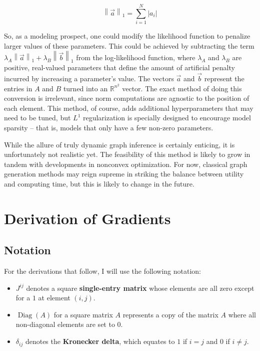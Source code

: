 \documentclass[12pt]{article}
\theoremstyle{definition}
\DeclareMathOperator{\Diag}{Diag}
\newcommand{\norm}[1]{\left\lVert#1\right\rVert}
\begin{document}
\begin{equation}
    \label{eqn:normL1}
    \norm{\vec{a}}_1 = \sum_{i=1}^N |a_i|
\end{equation}

So, as a modeling prospect, one could modify the likelihood function to penalize larger values of these parameters. This could be achieved by subtracting the term $\lambda_A \norm{\vec{a}}_1 + \lambda_B \norm{\vec{b}}_1$ from the log-likelihood function, where $\lambda_A$ and $\lambda_B$ are positive, real-valued parameters that define the amount of artificial penalty incurred by increasing a parameter's value. The vectors $\vec{a}$ and $\vec{b}$ represent the entries in $A$ and $B$ turned into an $\mathbb{R}^{n^2}$ vector. The exact method of doing this conversion is irrelevant, since norm computations are agnostic to the position of each element. This method, of course, adds additional hyperparameters that may need to be tuned, but $L^1$ regularization is specially designed to encourage model sparsity -- that is, models that only have a few non-zero parameters.

While the allure of truly dynamic graph inference is certainly enticing, it is unfortunately not realistic yet. The feasibility of this method is likely to grow in tandem with developments in nonconvex optimization. For now, classical graph generation methods may reign supreme in striking the balance between utility and computing time, but this is likely to change in the future.



\newpage

\appendix

\section{Derivation of Gradients}

\subsection{Notation}

For the derivations that follow, I will use the following notation:

\begin{itemize}
    \item $J^{ij}$ denotes a square \textbf{single-entry matrix} whose elements are all zero except for a $1$ at element $(i,j)$.
    \item $\Diag(A)$ for a square matrix $A$ represents a copy of the matrix $A$ where all non-diagonal elements are set to $0$.
    \item $\delta_{ij}$ denotes the \textbf{Kronecker delta}, which equates to $1$ if $i = j$ and $0$ if $i \neq j$.
\end{itemize}
\end{document}
